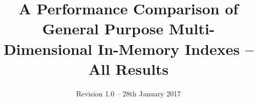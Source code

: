\documentclass{vldb}
\begin{document}
\title{A Performance Comparison of General Purpose Multi-Dimensional In-Memory Indexes -- All Results}
\subtitle{Revision 1.0 -- 28th January 2017}


%
%
%
%
%

%
\end{document}
